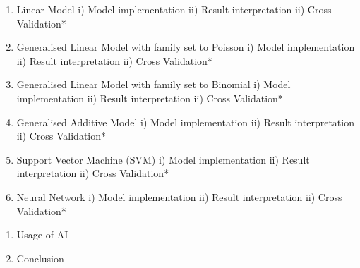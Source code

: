 \documentclass[
]{article}
\begin{document}
\begin{enumerate}
\def\labelenumi{\alph{enumi})}
\item
  Linear Model i) Model implementation ii) Result interpretation ii)
  Cross Validation*
\item
  Generalised Linear Model with family set to Poisson i) Model
  implementation ii) Result interpretation ii) Cross Validation*
\item
  Generalised Linear Model with family set to Binomial i) Model
  implementation ii) Result interpretation ii) Cross Validation*
\item
  Generalised Additive Model i) Model implementation ii) Result
  interpretation ii) Cross Validation*
\item
  Support Vector Machine (SVM) i) Model implementation ii) Result
  interpretation ii) Cross Validation*
\item
  Neural Network i) Model implementation ii) Result interpretation ii)
  Cross Validation*
\end{enumerate}

\begin{enumerate}
\def\labelenumi{\arabic{enumi}.}
\setcounter{enumi}{4}
\item
  Usage of AI
\item
  Conclusion
\end{enumerate}
\end{document}
